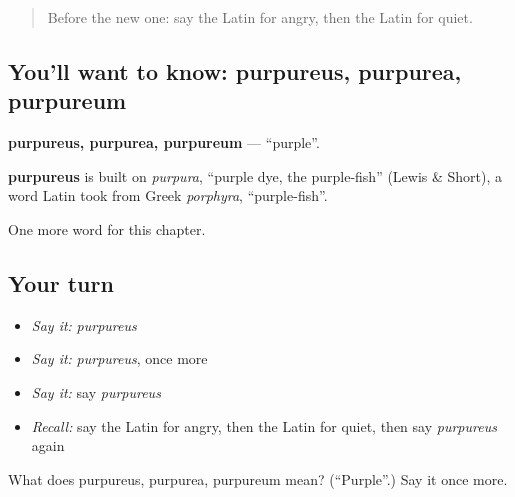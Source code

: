 \label{lesson:LA-C148-purpureus}



\begin{quote}
Before the new one: say the Latin for angry, then the Latin for quiet.
\end{quote}

\subsection*{You'll want to know: purpureus, purpurea, purpureum}
\textbf{purpureus, purpurea, purpureum} — \textquotedblleft{}purple\textquotedblright{}.

\begin{cousinweb}
\textbf{purpureus} is built on \emph{purpura}, \textquotedblleft{}purple dye, the purple-fish\textquotedblright{} (Lewis \& Short), a word Latin took from Greek \emph{porphyra}, \textquotedblleft{}purple-fish\textquotedblright{}.
\end{cousinweb}

\begin{grammarlens}[title={What you've built}]
One more word for this chapter.
\end{grammarlens}

\subsection*{Your turn}
\begin{itemize}
\raggedright
  \item \emph{Say it:} \emph{purpureus}
  \item \emph{Say it:} \emph{purpureus}, once more
  \item \emph{Say it:} say \emph{purpureus}
  \item \emph{Recall:} say the Latin for angry, then the Latin for quiet, then say \emph{purpureus} again
\end{itemize}

\begin{tcolorbox}[breakable,colback=teal!4,colframe=teal!35!black,title={Before you move on}]
What does purpureus, purpurea, purpureum mean? (\textquotedblleft{}Purple\textquotedblright{}.) Say it once more.
\end{tcolorbox}
